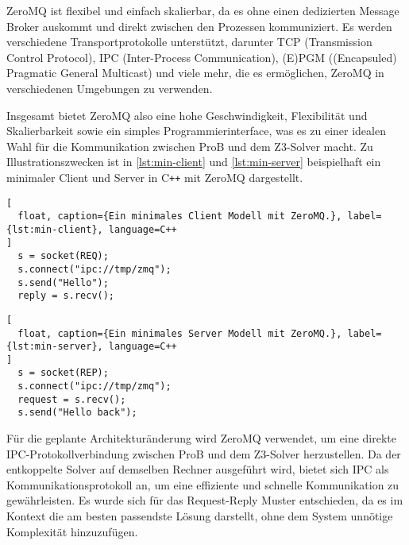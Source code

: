 ZeroMQ ist flexibel und einfach skalierbar, da es ohne einen dedizierten Message Broker auskommt und direkt zwischen den Prozessen kommuniziert.
Es werden verschiedene Transportprotokolle unterstützt, darunter TCP (Transmission Control Protocol), IPC (Inter-Process Communication), (E)PGM ((Encapsuled) Pragmatic General Multicast) und viele mehr, die es ermöglichen, ZeroMQ in verschiedenen Umgebungen zu verwenden.

Insgesamt bietet ZeroMQ also eine hohe Geschwindigkeit, Flexibilität und Skalierbarkeit sowie ein simples Programmierinterface,
was es zu einer idealen Wahl für die Kommunikation zwischen ProB und dem Z3-Solver macht.
Zu Illustrationszwecken ist in \cref{lst:min-client} und \cref{lst:min-server}  beispielhaft ein minimaler Client und Server in C\texttt{++} mit ZeroMQ dargestellt.

\begin{lstlisting}[
  float, caption={Ein minimales Client Modell mit ZeroMQ.}, label={lst:min-client}, language=C++
]
  s = socket(REQ);
  s.connect("ipc://tmp/zmq");
  s.send("Hello");
  reply = s.recv();
\end{lstlisting}

\begin{lstlisting}[
  float, caption={Ein minimales Server Modell mit ZeroMQ.}, label={lst:min-server}, language=C++
]
  s = socket(REP);
  s.connect("ipc://tmp/zmq");
  request = s.recv();
  s.send("Hello back");
\end{lstlisting}
\FloatBarrier

Für die geplante Architekturänderung wird ZeroMQ verwendet, um eine direkte IPC-Protokollverbindung zwischen ProB und dem Z3-Solver herzustellen.
Da der entkoppelte Solver auf demselben Rechner ausgeführt wird, bietet sich IPC als Kommunikationsprotokoll an, um eine effiziente und schnelle Kommunikation zu gewährleisten.
Es wurde sich für das Request-Reply Muster entschieden, da es im Kontext die am besten passendste Lösung darstellt,
ohne dem System unnötige Komplexität hinzuzufügen.
